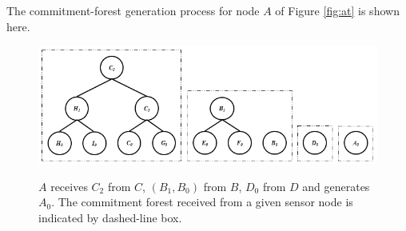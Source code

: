 			\begin{exmp} The commitment-forest generation process for node $A$ of Figure \ref{fig:at} is shown here.\\
				\begin{figure}[h!]
					\includegraphics[width=6in]{images/commitment-tree-example-1-shia.png}\\
					\caption{$A$ receives $C_{2}$ from $C$, $(B_{1},B_{0})$ from $B$, $D_{0}$ from $D$ and generates $A_{0}$. The commitment forest received from a given sensor node is indicated by dashed-line box.}
					\label{fig:commitment-tree-example-1-shia}
				\end{figure}\\


\end{exmp}
